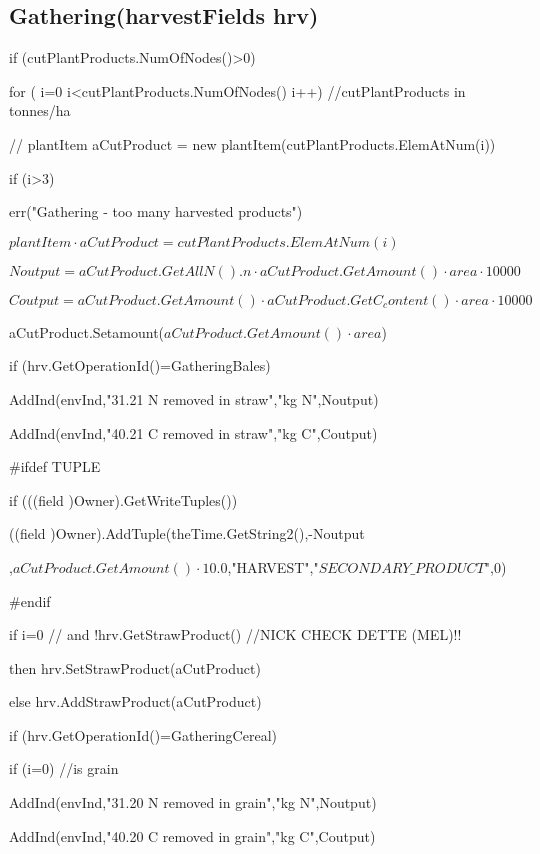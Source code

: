 \documentclass[%
]{scrartcl}
\begin{document}
\subsection{Gathering(harvestFields   hrv)}
   if (cutPlantProducts.NumOfNodes()>0)
   {
      for ( i=0 i<cutPlantProducts.NumOfNodes() i++)  //cutPlantProducts in tonnes/ha
      {

//         plantItem   aCutProduct = new plantItem(cutPlantProducts.ElemAtNum(i))
     
    if (i>3)
      
      err("Gathering - too many harvested products")
       
  $plantItem \cdot  aCutProduct = cutPlantProducts.ElemAtNum(i)$
        
   $Noutput = aCutProduct.GetAllN().n \cdot aCutProduct.GetAmount() \cdot area \cdot 10000$
       
  $  Coutput = aCutProduct.GetAmount() \cdot aCutProduct.GetC_content() \cdot area \cdot 10000$
       
  aCutProduct.Setamount($aCutProduct.GetAmount() \cdot area$)
        
 if (hrv.GetOperationId()=GatheringBales)
         {
      
      AddInd(envInd,"31.21 N removed in straw","kg N",Noutput)
     
       AddInd(envInd,"40.21 C removed in straw","kg C",Coutput)

\#ifdef TUPLE
           
 if (((field  )Owner).GetWriteTuples())
  
  \quad            ((field  )Owner).AddTuple(theTime.GetString2(),-Noutput

,$aCutProduct.GetAmount() \cdot 10.0$,"HARVEST","$SECONDARY\_PRODUCT$",0)

\#endif
           
 if i=0  // and !hrv.GetStrawProduct() //NICK CHECK DETTE (MEL)!!
            
          \quad  then    hrv.SetStrawProduct(aCutProduct)
            
          \quad     else   hrv.AddStrawProduct(aCutProduct)
        
       
  if (hrv.GetOperationId()=GatheringCereal)
      
       
     if (i=0)   //is grain
           

         		 AddInd(envInd,"31.20 N removed in grain","kg N",Noutput)
              
 AddInd(envInd,"40.20 C removed in grain","kg C",Coutput)

}}}
\end{document}
